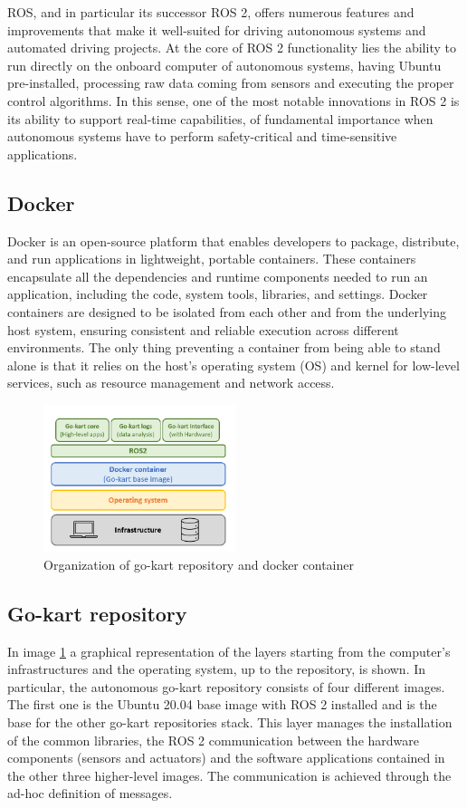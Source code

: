 \documentclass[a4paper,12pt,oneside]{book}
\begin{document}
\bigskip
ROS, and in particular its successor ROS 2, offers numerous features and improvements that make it well-suited for driving autonomous systems and automated driving projects.
At the core of ROS 2 functionality lies the ability to run directly on the onboard computer of autonomous systems, having Ubuntu pre-installed, processing raw data coming from sensors and executing the proper control algorithms.
In this sense, one of the most notable innovations in ROS 2 is its ability to support real-time capabilities, of fundamental importance when autonomous systems have to perform safety-critical and time-sensitive applications.


\subsection*{Docker}
Docker is an open-source platform that enables developers to package, distribute, and run applications in lightweight, portable containers. 
These containers encapsulate all the dependencies and runtime components needed to run an application, including the code, system tools, libraries, and settings.
Docker containers are designed to be isolated from each other and from the underlying host system, ensuring consistent and reliable execution across different environments.
The only thing preventing a container from being able to stand alone is that it relies on the host’s operating system (OS) and kernel for low-level services, such as resource management and network access.
\begin{figure}
	\centering
	\includegraphics[width=0.5\textwidth]{Docker.png}
	\caption{Organization of go-kart repository and docker container}
	\label{image:Docker}
\end{figure}

\subsection*{Go-kart repository}
In image \ref{image:Docker} a graphical representation of the layers starting from the computer's infrastructures and the operating system, up to the repository, is shown.
In particular, the autonomous go-kart repository consists of four different images. 
The first one is the Ubuntu 20.04 base image with ROS 2 installed and is the base for the other go-kart repositories stack.
This layer manages the installation of the common libraries, the ROS 2 communication between the hardware components (sensors and actuators) and the software applications contained in the other three higher-level images. 
The communication is achieved through the ad-hoc definition of messages.
\end{document}
